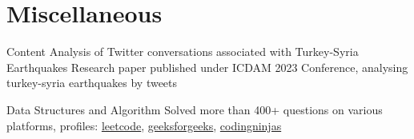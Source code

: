\section{Miscellaneous}
\resumeSubHeadingListStart
\resumeSubheading
{Content Analysis of Twitter conversations associated with Turkey-Syria Earthquakes}{}
{Research paper published under ICDAM 2023 Conference, analysing turkey-syria earthquakes by tweets}{}

\resumeSubheading
{Data Structures and Algorithm}{}
{Solved more than 400+ questions on various platforms, profiles: \href{https://leetcode.com/hskleetcode/}{leetcode}, \href{https://auth.geeksforgeeks.org/user/hari01584}{geeksforgeeks}, \href{https://www.codingninjas.com/studio/profile/Harishankar}{codingninjas}}{}
\resumeSubHeadingListEnd